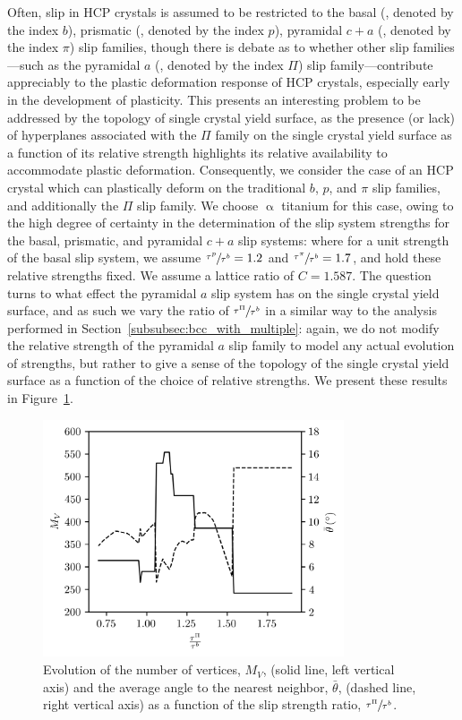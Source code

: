 \documentclass[preprint,3p,times,sort&compress,letterpaper,12pt]{elsarticle} %
\begin{document}
Often, slip in HCP crystals is assumed to be restricted to the basal (, denoted by the index $b$), prismatic (, denoted by the index $p$), pyramidal $c+a$ (, denoted by the index $\pi$) slip families, though there is debate as to whether other slip families---such as the pyramidal $a$ (, denoted by the index $\Pi$) slip family---contribute appreciably to the plastic deformation response of HCP crystals, especially early in the development of plasticity. This presents an interesting problem to be addressed by the topology of single crystal yield surface, as the presence (or lack) of hyperplanes associated with the $\Pi$ family on the single crystal yield surface as a function of its relative strength highlights its relative availability to accommodate plastic deformation. Consequently, we consider the case of an HCP crystal which can plastically deform on the traditional $b$, $p$, and $\pi$ slip families, and additionally the $\Pi$ slip family. We choose $\upalpha$ titanium for this case, owing to the high degree of certainty in the determination of the slip system strengths for the basal, prismatic, and pyramidal $c+a$ slip systems: where for a unit strength of the basal slip system, we assume $\sfrac{\tau^p}{\tau^b}=1.2$ and $\sfrac{\tau^{\pi}}{\tau^{b}}=1.7$, and hold these relative strengths fixed. We assume a lattice ratio of $C=1.587$. The question turns to what effect the pyramidal $a$ slip system has on the single crystal yield surface, and as such we vary the ratio of $\sfrac{\tau^{\Pi}}{\tau^b}$ in a similar way to the analysis performed in Section~\ref{subsubsec:bcc_with_multiple}: again, we do not modify the relative strength of the pyramidal $a$ slip family to model any actual evolution of strengths, but rather to give a sense of the topology of the single crystal yield surface as a function of the choice of relative strengths. We present these results in Figure~\ref{fig:hcp_pyr_a_trends}.
\begin{figure}[H]
    \centering
    \includegraphics[width=3.5in]{hcp_pyr_a_trends.png}
    \caption{Evolution of the number of vertices, $M_V$, (solid line, left vertical axis) and the average angle to the nearest neighbor, $\bar{\theta}$, (dashed line, right vertical axis) as a function of the slip strength ratio, $\sfrac{\tau^{\Pi}}{\tau^{b}}$.}
    \label{fig:hcp_pyr_a_trends}
\end{figure}
\end{document}
